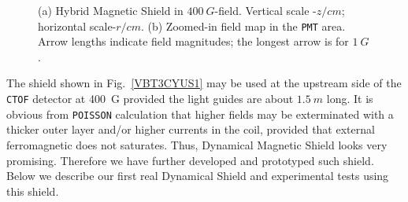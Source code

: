 \documentclass[12pt]{article}
\begin{document}
\begin{figure}[ht]%
\centering
{}
\qquad
{}
\caption{\small{(a) Hybrid Magnetic Shield in  $400~G$-field. 
Vertical scale -$z/cm$; horizontal scale-$r/cm$.
(b) Zoomed-in field map in the {\tt PMT} area.
Arrow lengths indicate  field magnitudes; 
the longest  arrow  is for  $1~G$.}}
\end{figure}

The  shield shown in Fig.~\ref{VBT3CYUS1}  may be used at the 
upstream side of the {\tt CTOF} detector at  400~G provided 
the light guides are about $1.5~m$ long. 
It is obvious from  {\tt POISSON} calculation that  higher fields may be  
exterminated with a thicker outer layer and/or 
higher currents in the  coil, 
provided that external ferromagnetic does not saturates.
Thus, Dynamical  Magnetic Shield looks  very promising. 
Therefore we have  further  developed   and  prototyped  such shield.
Below we describe our first real Dynamical Shield  and 
experimental tests using this shield.
\end{document}
